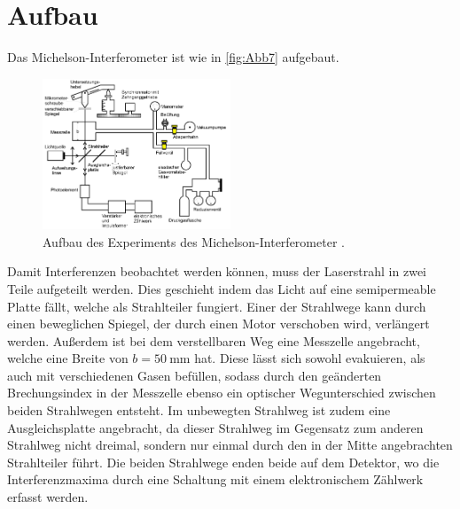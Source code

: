 \section{Aufbau}
\label{sec:Aufbau}

Das Michelson-Interferometer ist wie in \autoref{fig:Abb7} aufgebaut.
\begin{figure}[H]
    \centering
    \includegraphics[width=0.5\textwidth]{build/Abb7.PNG}
    \caption {Aufbau des Experiments des Michelson-Interferometer \cite[3]{V401}.}
    \label{fig:Abb7}
\end{figure}
Damit Interferenzen beobachtet werden können, muss der Laserstrahl in zwei Teile aufgeteilt werden.
Dies geschieht indem das Licht auf eine semipermeable Platte fällt, welche als Strahlteiler fungiert.
Einer der Strahlwege kann durch einen beweglichen Spiegel, der durch einen Motor verschoben wird, verlängert werden.
Außerdem ist bei dem verstellbaren Weg eine Messzelle angebracht, welche eine Breite von $b=\qty{50}{\milli\meter}$ hat.
Diese lässt sich sowohl evakuieren, als auch mit verschiedenen Gasen befüllen, sodass durch
den geänderten Brechungsindex in der Messzelle ebenso ein optischer Wegunterschied
zwischen beiden Strahlwegen entsteht.
Im unbewegten Strahlweg ist zudem eine Ausgleichsplatte angebracht, da dieser Strahlweg im
Gegensatz zum anderen Strahlweg nicht dreimal, sondern nur einmal durch den in der
Mitte angebrachten Strahlteiler führt.
Die beiden Strahlwege enden beide auf dem Detektor, wo die Interferenzmaxima durch eine Schaltung mit einem elektronischem Zählwerk erfasst werden.

